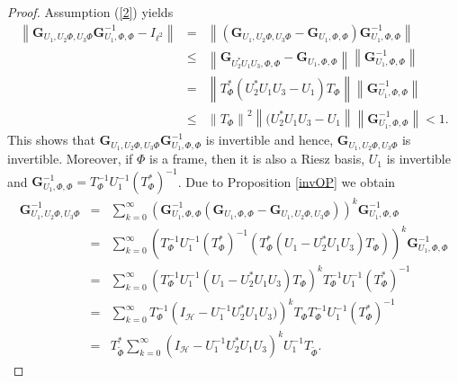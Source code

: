\documentclass{birkjour}
\theoremstyle{definition}
\theoremstyle{remark}
\numberwithin{equation}{section}
\begin{document}
\begin{proof}
 Assumption (\ref{2}) yields
\begin{eqnarray*}
 \left\|\mathbf{G}_{U_{1},U_{2}\Phi,U_{3}\Phi}\mathbf{G}_{U_{1},\Phi,\Phi}^{-1}-I_{\ell^{2}}\right\|&=&\left\|\left(\mathbf{G}_{U_{1},U_{2}\Phi,U_{3}\Phi}-\mathbf{G}_{U_{1},\Phi,\Phi}\right)\mathbf{G}_{U_{1},\Phi,\Phi}^{-1}\right\|\\
&\leq&\left\|\mathbf{G}_{U_{2}^{*}U_{1}U_{3},\Phi,\Phi}-\mathbf{G}_{U_{1},\Phi,\Phi}\right\|\left\|\mathbf{G}_{U_{1},\Phi,\Phi}^{-1}\right\|\\
&=&\left\|T_{\Phi}^{*}\left(U_{2}^{*}U_{1}U_{3}-U_{1}\right)T_{\Phi}\right\|\left\|\mathbf{G}_{U_{1},\Phi,\Phi}^{-1}\right\|\\
&\leq&\left\|T_{\Phi}\right\|^{2}\left\|(U_{2}^{*}U_{1}U_{3}-U_{1}\right\|\left\|\mathbf{G}_{U_{1},\Phi,\Phi}^{-1}\right\|< 1.
 \end{eqnarray*}
This shows that $\mathbf{G}_{U_{1},U_{2}\Phi,U_{3}\Phi}\mathbf{G}_{U_{1},\Phi,\Phi}^{-1}$ is invertible and hence,  $\mathbf{G}_{U_{1},U_{2}\Phi,U_{3}\Phi}$ is invertible. Moreover, if $\Phi$ is a
frame, then it is also a Riesz basis, $U_1$ is invertible and $\mathbf{G}_{U_{1},\Phi,\Phi}^{-1}=T_{\Phi}^{-1}U_1^{-1}\left(T_{\Phi}^*\right)^{-1}$. Due to Proposition \ref{invOP} we obtain
 \begin{eqnarray*}
 \mathbf{G}_{U_{1},U_{2}\Phi,U_{3}\Phi}^{-1}&=&
 \sum_{k=0}^{\infty}\left(\mathbf{G}_{U_{1},\Phi,\Phi}^{-1}\left(\mathbf{G}_{U_{1},\Phi,\Phi}- \mathbf{G}_{U_{1},U_{2}\Phi,U_{3}\Phi}\right)\right)^{k}\mathbf{G}_{U_{1},\Phi,\Phi}^{-1}\\
 &=&\sum_{k=0}^{\infty}\left(T_{\Phi}^{-1}U_1^{-1}\left(T_{\Phi}^*\right)^{-1}
 \left(T_{\Phi}^{*}\left(U_1-U_{2}^{*}U_1U_{3}\right)T_{\Phi}\right)\right)^{k}\mathbf{G}_{U_{1},\Phi,\Phi}^{-1}\\
  &=&\sum_{k=0}^{\infty}\left(T_{\Phi}^{-1}U_1^{-1}
 \left(U_1-U_{2}^{*}U_1U_{3}\right)T_{\Phi}\right)^{k}
 T_{\Phi}^{-1}U_1^{-1}\left(T_{\Phi}^*\right)^{-1}\\
&=&\sum_{k=0}^{\infty}T_{\Phi}^{-1}
\left(I_{\mathcal{H}}-U_{1}^{-1}U_{2}^*U_{1}U_3)\right)^{k}T_{\Phi} T_{\Phi}^{-1}U_{1}^{-1}\left(T_{\Phi}^{*}\right)^{-1}\\
 &=&T_{\widetilde{\Phi}}^{*}\sum_{k=0}^{\infty}
\left(I_{\mathcal{H}}-U_{1}^{-1}U_{2}^*U_{1}U_3\right)^{k}U_{1}^{-1}T_{\widetilde{\Phi}}.
 \end{eqnarray*}
\end{proof}
\end{document}
